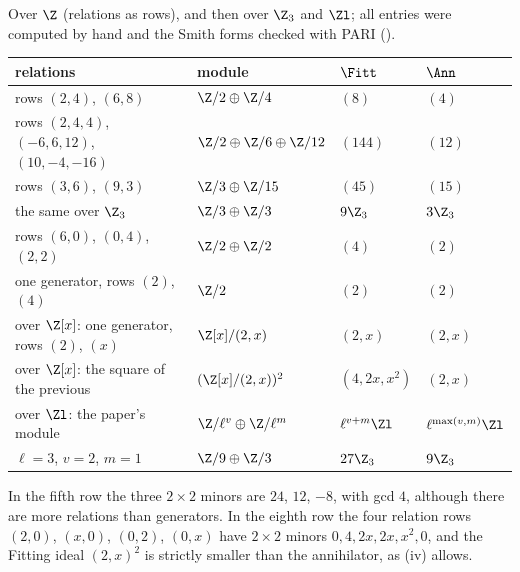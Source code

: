 \begin{example}\label{ex:modules:fitting-examples}
Over $\Z$ (relations as rows), and then over $\Z_3$ and $\Zl$; all entries were computed by hand and the Smith forms checked with PARI
().
\begin{center}\small
\begin{tabular}{llll}
\toprule
relations & module & $\Fitt$ & $\Ann$\\
\midrule
rows $(2,4)$, $(6,8)$ & $\Z/2\oplus\Z/4$ & $(8)$ & $(4)$\\
rows $(2,4,4)$, $(-6,6,12)$, $(10,-4,-16)$ & $\Z/2\oplus\Z/6\oplus\Z/12$ & $(144)$ & $(12)$\\
rows $(3,6)$, $(9,3)$ & $\Z/3\oplus\Z/15$ & $(45)$ & $(15)$\\
the same over $\Z_3$ & $\Z/3\oplus\Z/3$ & $9\Z_3$ & $3\Z_3$\\
rows $(6,0)$, $(0,4)$, $(2,2)$ & $\Z/2\oplus\Z/2$ & $(4)$ & $(2)$\\
one generator, rows $(2)$, $(4)$ & $\Z/2$ & $(2)$ & $(2)$\\
over $\Z[x]$: one generator, rows $(2)$, $(x)$ & $\Z[x]/(2,x)$ & $(2,x)$ & $(2,x)$\\
over $\Z[x]$: the square of the previous & $(\Z[x]/(2,x))^2$ & $(4,2x,x^2)$ & $(2,x)$\\
over $\Zl$: the paper's module & $\Z/\ell^v\oplus\Z/\ell^m$ & $\ell^{v+m}\Zl$ & $\ell^{\max(v,m)}\Zl$\\
$\ell=3$, $v=2$, $m=1$ & $\Z/9\oplus\Z/3$ & $27\Z_3$ & $9\Z_3$\\
\bottomrule
\end{tabular}
\end{center}
In the fifth row the three $2\times2$ minors are $24$, $12$, $-8$, with gcd $4$, although there are more relations than generators. In the
eighth row the four relation rows $(2,0)$, $(x,0)$, $(0,2)$, $(0,x)$ have $2\times2$ minors $0,4,2x,2x,x^2,0$, and the Fitting ideal $(2,x)^2$ is strictly
smaller than the annihilator, as (iv) allows.
\end{example}

